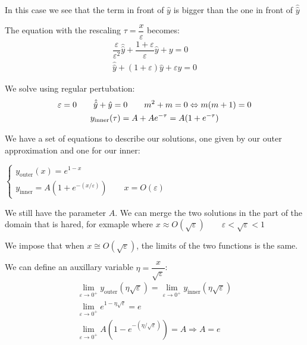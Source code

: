\noindent In this case we see that the term in front of $\hat{y}$ is bigger than the one in front of $\hat{\hat{y}}$ 
\par\bigskip
\noindent The equation with the rescaling $\tau = \dfrac{x}{\varepsilon}$ becomes:
\begin{equation*}
  \begin{gathered}
    \dfrac{\varepsilon}{\varepsilon^2}\hat{\hat{y}} + \dfrac{1+\varepsilon}{\varepsilon}\hat{y} + y = 0\\
    \hat{\hat{y}}+(1+\varepsilon)\hat{y}+\varepsilon y = 0
  \end{gathered}
\end{equation*}\par
\noindent We solve using regular pertubation:
\begin{equation*}
  \begin{gathered}
    \varepsilon = 0\qquad \hat{\hat{y}}+\hat{y} = 0\qquad m^2+m=0\Leftrightarrow m(m+1) = 0\\
    y_{\text{inner}}(\tau) = A+Ae^{-\tau} = A(1+e^{-\tau})
  \end{gathered}
\end{equation*}
\par\bigskip
\noindent We have a set of equations to describe our solutions, one given by our outer approximation and one for our inner:
\par\bigskip
$
\begin{cases*}
  y_{\text{outer}}(x) = e^{1-x}\\
  y_{\text{inner}} = A(1+e^{-(x/\varepsilon)})\qquad x= O(\varepsilon)
\end{cases*}$
\par\bigskip
\noindent We still have the parameter $A$. We can merge the two solutions in the part of the domain that is hared, for exmaple where $x\approx O(\sqrt{\varepsilon})\qquad \varepsilon<\sqrt{\varepsilon}<1$\par
\noindent We impose that when $x\cong O(\sqrt{\varepsilon})$, the limits of the two functions is the same.
\par\bigskip
\noindent We can define an auxillary variable $\eta = \dfrac{x}{\sqrt{\varepsilon}}$:
\begin{equation*}
  \begin{gathered}
    \lim_{\varepsilon\to0^+}y_{\text{outer}}(\eta\sqrt{\varepsilon}) = \lim_{\varepsilon\to0^+}y_{\text{inner}}(\eta\sqrt{\varepsilon})\\
    \lim_{\varepsilon\to0^+}e^{1-\eta\sqrt{\varepsilon}} = e\\
    \lim_{\varepsilon\to0^+}A\left(1-e^{-(\eta/\sqrt{\varepsilon})}\right) = A\Rightarrow A = e
  \end{gathered}
\end{equation*}

